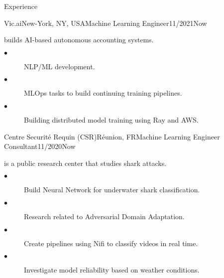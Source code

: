 \documentclass{resume}
\begin{document}
\begin{multicols}{2}
	\begin{rSection}{\Large Experience}
	
		\begin{job}{Vic.ai}{New-York, NY, USA}{Machine Learning Engineer}{11/2021}{Now}{
			builds AI-based autonomous accounting systems.
			\begin{description}
				\item[$\bullet$] NLP/ML development.
				\item[$\bullet$] MLOps tasks to build continuing training pipelines.
				\item[$\bullet$] Building distributed model training using Ray and AWS.
			\end{description}
		}
		\end{job}

		\begin{job}{Centre Securité Requin (CSR)}{Réunion, FR}{Machine Learning Engineer Consultant}{11/2020}{Now}{
			is a public research center that studies shark attacks.
			\begin{description}
				\item[$\bullet$] Build Neural Network for underwater shark classification.
				\item[$\bullet$] Research related to Adversarial Domain Adaptation.
				\item[$\bullet$] Create pipelines using Nifi to classify videos in real time.
				\item[$\bullet$] Investigate model reliability based on weather conditions.
			\end{description}
		}
		\end{job}


\end{rSection}
\end{multicols}
\end{document}
